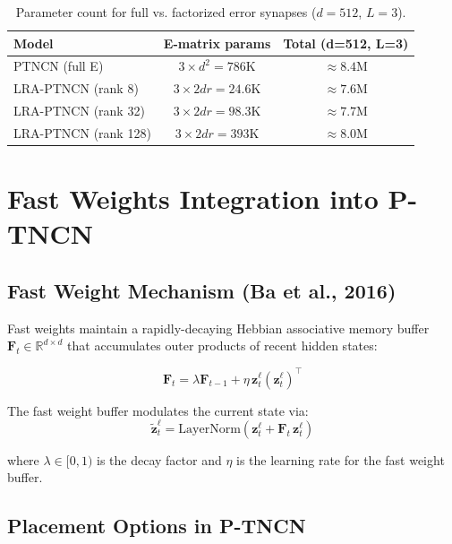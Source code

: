 \documentclass[11pt]{article}
\theoremstyle{definition}
\newcommand{\vz}{\mathbf{z}}
\newcommand{\Rbb}{\mathbb{R}}
\begin{document}
\begin{table}[h]
\centering
\begin{tabular}{lcc}
\toprule
\textbf{Model} & \textbf{E-matrix params} & \textbf{Total (d=512, L=3)} \\
\midrule
PTNCN (full E)       & $3 \times d^2 = 786$K    & $\approx 8.4$M \\
LRA-PTNCN (rank 8)   & $3 \times 2dr = 24.6$K   & $\approx 7.6$M \\
LRA-PTNCN (rank 32)  & $3 \times 2dr = 98.3$K   & $\approx 7.7$M \\
LRA-PTNCN (rank 128) & $3 \times 2dr = 393$K    & $\approx 8.0$M \\
\bottomrule
\end{tabular}
\caption{Parameter count for full vs. factorized error synapses ($d=512$, $L=3$).}
\end{table}

\section{Fast Weights Integration into P-TNCN}

\subsection{Fast Weight Mechanism (Ba et al., 2016)}

Fast weights maintain a rapidly-decaying Hebbian associative memory buffer
$\mathbf{F}_t \in \Rbb^{d \times d}$ that accumulates outer products of recent
hidden states:

\begin{equation}
  \label{eq:fast_weight_update}
  \mathbf{F}_t = \lambda \mathbf{F}_{t-1} + \eta \, \vz^\ell_t \left(\vz^\ell_t\right)^\top
\end{equation}

The fast weight buffer modulates the current state via:
\begin{equation}
  \label{eq:fast_weight_apply}
  \tilde{\vz}^\ell_t = \mathrm{LayerNorm}\!\left(\vz^\ell_t + \mathbf{F}_t \, \vz^\ell_t\right)
\end{equation}

where $\lambda \in [0, 1)$ is the decay factor and $\eta$ is the learning rate
for the fast weight buffer.

\subsection{Placement Options in P-TNCN}
\end{document}
